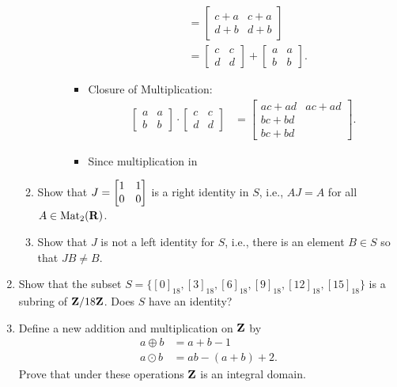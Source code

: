 \documentclass[11pt]{article}
\begin{document}
\begin{enumerate}
\begin{enumerate}
\begin{description}
\begin{itemize}
\begin{align*}
                            &= \begin{bmatrix}c+a&c+a\\d+b&d+b\end{bmatrix}\\
                            &= \begin{bmatrix}c&c\\d&d\end{bmatrix} + \begin{bmatrix}a&a\\b&b\end{bmatrix}.
          \end{align*}
        \item Closure of Multiplication:
          \begin{align*}
            \begin{bmatrix}a&a\\b&b\end{bmatrix}\cdot \begin{bmatrix}c&c\\d&d\end{bmatrix} &= \begin{bmatrix}ac+ad & ac+ad\\bc+bd\\bc+bd\end{bmatrix}.
          \end{align*}
        \item Since multiplication in
      \end{itemize}
  \end{description}
\item Show that $J = \left[ \begin{matrix} 1 & 1 \\ 0 & 0 \end{matrix} \right]$ is a right identity in $S$, i.e., $AJ = A$ for all $A \in \operatorname{Mat}_2(\mathbf{R})$. 
\item Show that $J$ is not a left identity for $S$, i.e., there is an element $B \in S$ so that $JB \neq B$. 
\end{enumerate}

\item Show that the subset $S = \{[0]_{18}, [3]_{18}, [6]_{18}, [9]_{18}, [12]_{18}, [15]_{18}\}$ is a subring of $\mathbf{Z}/18\mathbf{Z}$.  Does $S$ have an identity?

\item Define a new addition and multiplication on $\mathbf{Z}$ by 
\begin{align*}
a\oplus b&= a+b-1 \\
a\odot b&= ab - (a+b)+2.
\end{align*}
Prove that under these operations $\mathbf{Z}$ is an integral domain. 


\end{enumerate}
\end{document}

